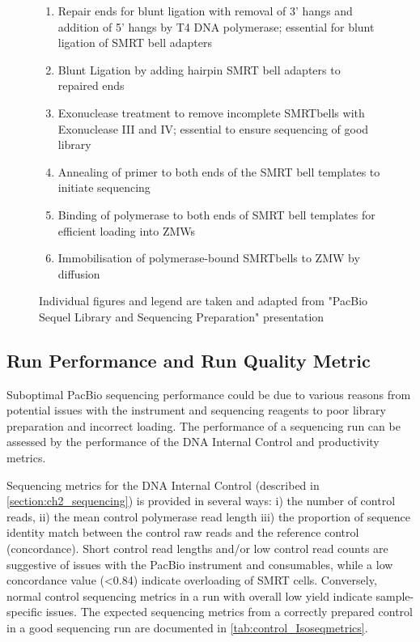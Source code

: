 \begin{figure}[!htp]
{\begin{enumerate}
			\item Repair ends for blunt ligation with removal of 3' hangs and addition of 5' hangs by T4 DNA polymerase; essential for blunt ligation of SMRT bell adapters 
			\item Blunt Ligation by adding hairpin SMRT bell adapters to repaired ends
			\item Exonuclease treatment to remove incomplete SMRTbells with Exonuclease III and IV; essential to ensure sequencing of good library 
			\item Annealing of primer to both ends of the SMRT bell templates to initiate sequencing 
			\item Binding of polymerase to both ends of SMRT bell templates for efficient loading into ZMWs
			\item Immobilisation of polymerase-bound SMRTbells to ZMW by diffusion
			\\
		\end{enumerate} 
		Individual figures and legend are taken and adapted from "PacBio Sequel Library and Sequencing Preparation" presentation
	}
	\label{fig:isoseq_labworkflow}
\end{figure}

\clearpage
\subsection{Run Performance and Run Quality Metric}
\label{sec: Isoseq_run_performance}
Suboptimal PacBio sequencing performance could be due to various reasons from potential issues with the instrument and sequencing reagents to poor library preparation and incorrect loading. The performance of a sequencing run can be assessed by the performance of the DNA Internal Control and productivity metrics. 

Sequencing metrics for the DNA Internal Control (described in \cref{section:ch2_sequencing}) is provided in several ways: i) the number of control reads, ii) the mean control polymerase read length iii) the proportion of sequence identity match between the control raw reads and the reference control (concordance). Short control read lengths and/or low control read counts are suggestive of issues with the PacBio instrument and consumables, while a low concordance value (<0.84) indicate overloading of SMRT cells. Conversely, normal control sequencing metrics in a run with overall low yield indicate sample-specific issues. The expected sequencing metrics from a correctly prepared control in a good sequencing run are documented in \cref{tab:control_Isoseqmetrics}. 


